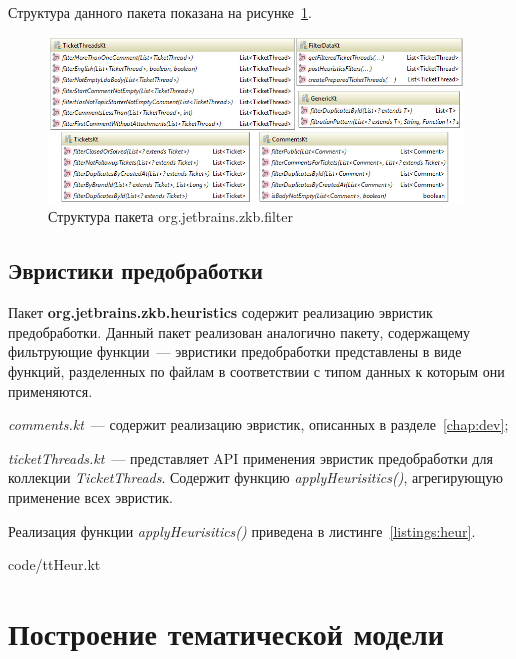 Структура данного пакета показана на рисунке~\ref{fig:filterpck}.

\begin{figure}[tph!]
\centerline{\includegraphics[width=11cm]{fig/filterpck.png}}
    \caption{Структура пакета org.jetbrains.zkb.filter}
    \label{fig:filterpck}
\end{figure}

\subsection{Эвристики предобработки}

Пакет \textbf{org.jetbrains.zkb.heuristics} содержит реализацию эвристик предобработки. Данный пакет реализован аналогично пакету, содержащему фильтрующие функции~--- эвристики предобработки представлены в виде функций, разделенных по файлам в соответствии с типом данных к которым они применяются.

\begin{itemize*}
\item \textit{comments.kt}~--- содержит реализацию эвристик, описанных в разделе~\ref{chap:dev};
\item \textit{ticketThreads.kt}~--- представляет API применения эвристик предобработки для коллекции \textit{TicketThreads}. Содержит функцию \textit{applyHeurisitics()}, агрегирующую применение всех эвристик.
\end{itemize*}

Реализация функции \textit{applyHeurisitics()} приведена в листинге~\ref{listings:heur}.


{code/ttHeur.kt}

\section{Построение тематической модели}
